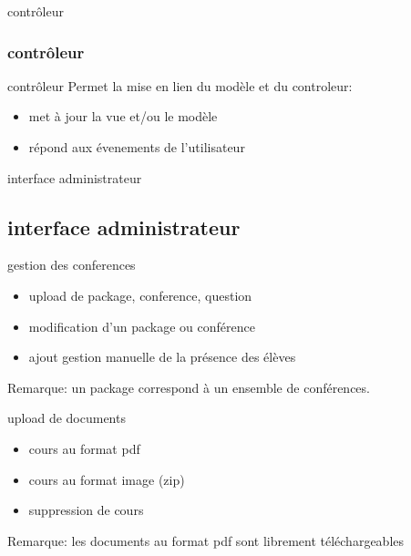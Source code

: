 \documentclass{beamer}
\begin{document}
\begin{frame}{contrôleur}
   \subsubsection{contrôleur}
	\begin{block}{contrôleur}
	Permet la mise en lien du modèle et du controleur:
		\begin{itemize}
			\item met à jour la vue et/ou le modèle
			\item répond aux évenements de l'utilisateur
		\end{itemize}
	\end{block}
			
\end{frame}


\begin{frame}{interface administrateur}
  \subsection {interface administrateur}
	\begin{block}{gestion des conferences}
		\begin{itemize}
			\item upload de package, conference, question
			\item modification d'un package ou conférence
			\item ajout gestion manuelle de la présence des élèves
		\end{itemize}
		Remarque: un package correspond à un ensemble de conférences.
	\end{block}

	\begin{block}{upload de documents}
		\begin{itemize}
			\item cours au format pdf
			\item cours au format image (zip)
			\item suppression de cours
		\end{itemize}
		Remarque: les documents au format pdf sont librement téléchargeables
	\end{block}
\end{frame}
\end{document}
